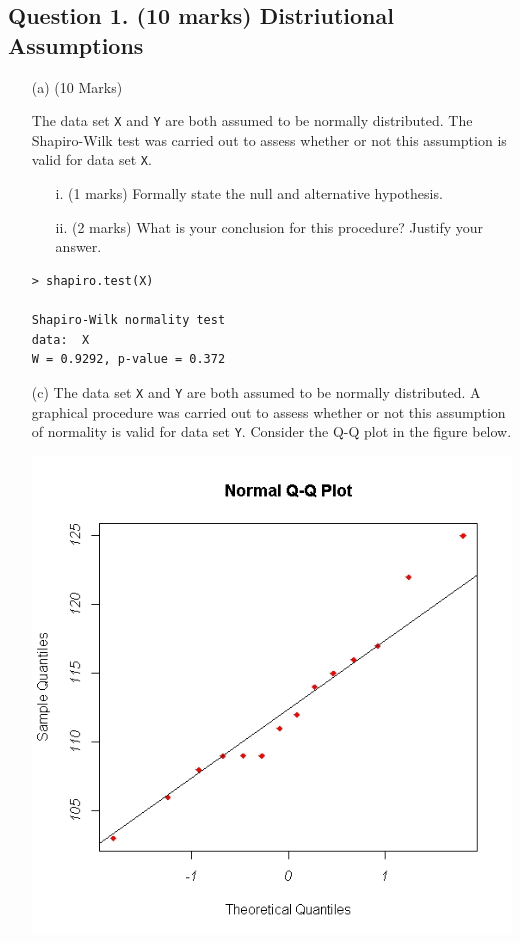 \documentclass[a4paper,12pt]{article}
\begin{document}
\subsection*{Question 1. (10 marks) Distriutional Assumptions}
\begin{itemize}
\item[(a)] (10 Marks) 

The data set \texttt{X} and \texttt{Y} are both assumed to be normally distributed. The Shapiro-Wilk test was carried out to assess whether or not this assumption is valid for data set \texttt{X}.
\begin{itemize}
	\item[i.] (1 marks) Formally state the null and alternative hypothesis.
	\item[ii.] (2 marks) What is your conclusion for this procedure? Justify your answer.
\end{itemize}
\begin{framed}
\begin{verbatim}
> shapiro.test(X)
	
Shapiro-Wilk normality test
data:  X
W = 0.9292, p-value = 0.372
\end{verbatim}
\end{framed}

\item [(c)] The data set \texttt{X} and \texttt{Y} are both assumed to be normally distributed. A graphical procedure was carried out to assess whether or not this assumption of normality is valid for data set \texttt{Y}. Consider the Q-Q plot in the figure below.

\begin{center}
	\includegraphics[scale=0.55]{Q5examQQplot}
\end{center}


\end{itemize}
\end{document}

